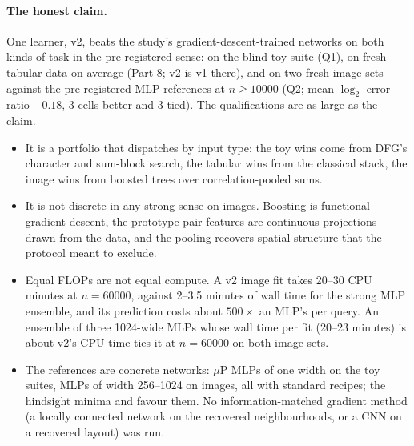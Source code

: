 \paragraph{The honest claim.} One learner, v2, beats the study's gradient-descent-trained networks on both kinds of task in the pre-registered sense: on the blind toy suite (Q1), on fresh tabular data on average (Part 8; v2 is v1 there), and on two fresh image sets against the pre-registered MLP references at $n\ge10000$ (Q2; mean $\log_2$ error ratio $-0.18$, 3 cells better and 3 tied). The qualifications are as large as the claim.
\begin{itemize}
\item It is a portfolio that dispatches by input type: the toy wins come from DFG's character and sum-block search, the tabular wins from the classical stack, the image wins from boosted trees over correlation-pooled sums.
\item It is not discrete in any strong sense on images. Boosting is functional gradient descent, the prototype-pair features are continuous projections drawn from the data, and the pooling recovers spatial structure that the protocol meant to exclude.
\item Equal FLOPs are not equal compute. A v2 image fit takes 20--30 CPU minutes at $n=60000$, against 2--3.5 minutes of wall time for the strong MLP ensemble, and its prediction costs about $500\times$ an MLP's per query. An ensemble of three 1024-wide MLPs whose wall time per fit (20--23 minutes) is about v2's CPU time ties it at $n=60000$ on both image sets.
\item The references are concrete networks: $\mu$P MLPs of one width on the toy suites, MLPs of width 256--1024 on images, all with standard recipes; the hindsight minima  and  favour them. No information-matched gradient method (a locally connected network on the recovered neighbourhoods, or a CNN on a recovered layout) was run.
\end{itemize}

